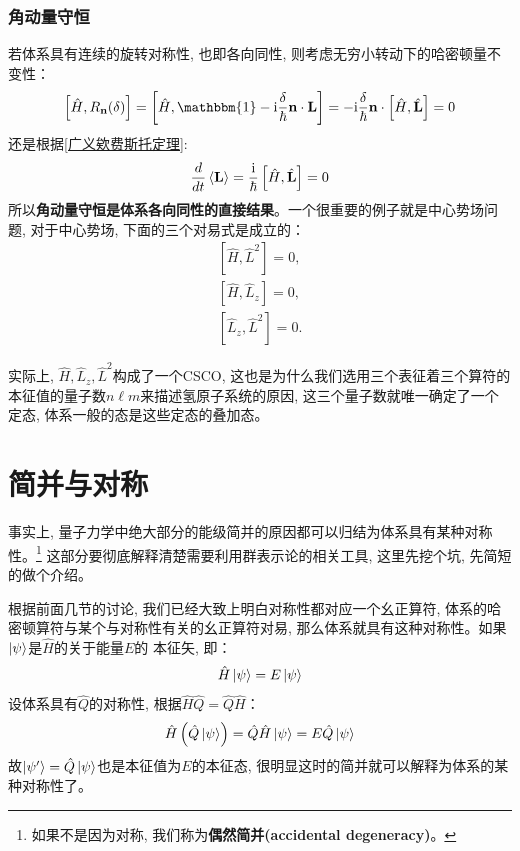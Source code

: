 \documentclass[a4paper,zihao=-4,linespread=1]{ctexrep}
\begin{document}
    \subsubsection*{角动量守恒}
    若体系具有连续的旋转对称性, 也即各向同性, 则考虑无穷小转动下的哈密顿量不变性：
    \begin{equation}
        \left[\hat{H},R_{\mathbf{n}}(\delta)\right]=\left[\hat H,\mathbbm{1}-\mathrm{i}\frac{\delta }{\hbar}\mathbf{n}\cdot\mathbf{L}\right]=-\mathrm i\frac{\delta}{\hbar}\mathbf{n}\cdot\left[\hat{H},\hat{\mathbf{L}}\right]=0
    \end{equation}
    还是根据\ref{广义欸费斯托定理}:
    \begin{equation}
        \frac{d}{dt}\braket{\mathbf{L}}=\frac{\mathrm i}{\hbar}\left[\hat{H},\hat{\mathbf{L}}\right]=0
    \end{equation}
    所以\textbf{角动量守恒是体系各向同性的直接结果}。一个很重要的例子就是中心势场问题, 对于中心势场, 下面的三个对易式是成立的：
    \begin{equation*}
        \begin{array}{l}
        {\left[\hat{H}, \hat{L}^{2}\right]=0,} \\
        {\left[\hat{H}, \hat{L}_{z}\right]=0,} \\
        {\left[\hat{L}_{z}, \hat{L}^{2}\right]=0.}
        \end{array}
    \end{equation*}
    
    实际上, $\hat{H},\hat{L}_z, \hat{L}^2$构成了一个CSCO, 这也是为什么我们选用三个表征着三个算符的本征值的量子数$n\ell m $来描述氢原子系统的原因, 这三个量子数就唯一确定了一个定态, 
    体系一般的态是这些定态的叠加态。

    \section{简并与对称}
    事实上, 量子力学中绝大部分的能级简并的原因都可以归结为体系具有某种对称性。\footnote{如果不是因为对称, 我们称为\textbf{偶然简并(accidental degeneracy)}。}
    这部分要彻底解释清楚需要利用群表示论的相关工具, 这里先挖个坑, 先简短的做个介绍。

    根据前面几节的讨论, 我们已经大致上明白对称性都对应一个幺正算符, 体系的哈密顿算符与某个与对称性有关的幺正算符对易, 那么体系就具有这种对称性。如果$\ket{\psi}$是$\hat{H}$的关于能量$E$的
    本征矢, 即：
    \[\hat{H}\ket{\psi}=E\ket{\psi}\]
    设体系具有$\hat{Q}$的对称性, 根据$\hat{H}\hat{Q}=\hat{Q}\hat{H}$：
    \begin{equation}
        \label{eq:6.46}
        \hat{H}\left(\hat{Q}\ket{\psi}\right)=\hat{Q}\hat{H}\ket{\psi}=E\hat{Q}\ket{\psi}
    \end{equation}
    故$\ket{\psi^\prime}=\hat{Q}\ket{\psi}$也是本征值为$E$的本征态, 很明显这时的简并就可以解释为体系的某种对称性了。
\end{document}
